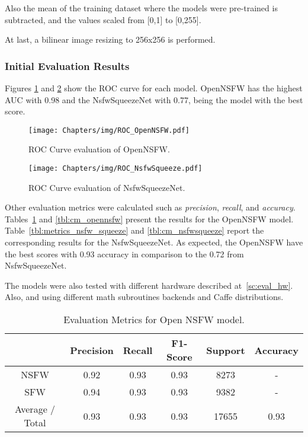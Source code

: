 Also the mean of the training dataset where the models were pre-trained is subtracted, and the values scaled from [0,1] to [0,255].

At last, a bilinear image resizing to 256x256 is performed.

\subsubsection{Initial Evaluation Results}

Figures \ref{fig:roc_opennsfw} and \ref{fig:roc_nsfwsqueeze} show the ROC curve for each model. OpenNSFW has the highest AUC with 0.98 and the NsfwSqueezeNet with 0.77, being the model with the best score.

\begin{figure}[H]
    \centering
    \texttt{[image: Chapters/img/ROC\_OpenNSFW.pdf]}
    \caption{ROC Curve evaluation of OpenNSFW.}
    \label{fig:roc_opennsfw}
\end{figure}

\begin{figure}[H]
    \centering
    \texttt{[image: Chapters/img/ROC\_NsfwSqueeze.pdf]}
    \caption{ROC Curve evaluation of NsfwSqueezeNet.}
    \label{fig:roc_nsfwsqueeze}
\end{figure}


Other evaluation metrics were calculated such as \emph{precision}, \emph{recall}, and \emph{accuracy}. Tables~\ref{tbl:metrics_open_nsfw} and \ref{tbl:cm_opennsfw} present the results for the OpenNSFW model. Table~\ref{tbl:metrics_nsfw_squeeze} and \ref{tbl:cm_nsfwsqueeze} report the corresponding results for the NsfwSqueezeNet.
As expected, the OpenNSFW have the best scores with 0.93 accuracy in comparison to the 0.72 from NsfwSqueezeNet.

The models were also tested with different hardware described at~\ref{sc:eval_hw}. Also, and using different math subroutines backends and Caffe distributions.

\begin{table}[]
\centering
\caption{Evaluation Metrics for Open NSFW model.}
\label{tbl:metrics_open_nsfw}
\begin{tabular}{c|c|c|c|c|c|}
\cline{2-6}
                                      & Precision & Recall & F1-Score & Support & Accuracy \\ \hline
\multicolumn{1}{|c|}{NSFW}            & 0.92      & 0.93   & 0.93     & 8273    & -        \\ \hline
\multicolumn{1}{|c|}{SFW}             & 0.94      & 0.93   & 0.93     & 9382    & -        \\ \hline
\multicolumn{1}{|c|}{Average / Total} & 0.93      & 0.93   & 0.93     & 17655   & 0.93     \\ \hline
\end{tabular}
\end{table}

